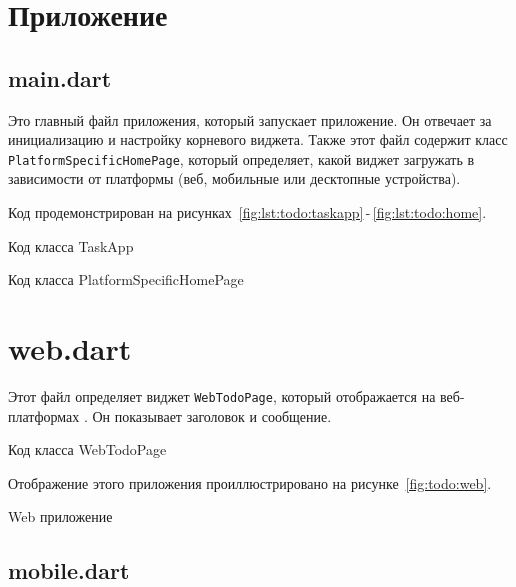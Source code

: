 \section{Приложение}

\subsection{main.dart}

Это главный файл приложения, который запускает приложение.
Он отвечает за инициализацию и настройку корневого виджета.
Также этот файл содержит класс \texttt{PlatformSpecificHomePage},
который определяет, какой виджет загружать в зависимости от платформы
(веб, мобильные или десктопные устройства).

Код продемонстрирован
на рисунках~\ref{fig:lst:todo:taskapp}\,-\,\ref{fig:lst:todo:home}.

\begin{image}
	\caption{Код класса TaskApp}
	\label{fig:lst:todo:taskapp}
\end{image}

\begin{image}
	\caption{Код класса PlatformSpecificHomePage}
	\label{fig:lst:todo:home}
\end{image}

\section{web.dart}

Этот файл определяет виджет \texttt{WebTodoPage},
который отображается на веб-платформах .
Он показывает заголовок и сообщение.

\begin{image}
	\caption{Код класса WebTodoPage}
	\label{fig:lst:todo:web}
\end{image}

Отображение этого приложения проиллюстрировано
на рисунке~\ref{fig:todo:web}.

\begin{image}
	\caption{Web приложение}
	\label{fig:todo:web}
\end{image}

\subsection{mobile.dart}

